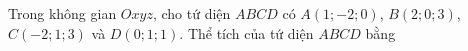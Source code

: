 \begin{ex}
Trong không gian $Oxyz$, cho tứ diện $ABCD$ có $A(1;-2;0)$, $B(2;0;3)$, $C(-2;1;3)$ và $D(0;1;1)$. Thể tích của tứ diện $ABCD$ bằng
\end{ex}
